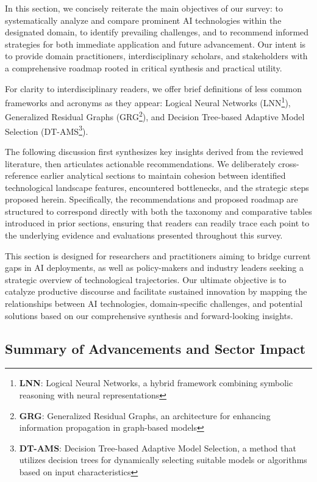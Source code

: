 \documentclass[sigconf]{acmart}
\begin{document}
In this section, we concisely reiterate the main objectives of our survey: to systematically analyze and compare prominent AI technologies within the designated domain, to identify prevailing challenges, and to recommend informed strategies for both immediate application and future advancement. Our intent is to provide domain practitioners, interdisciplinary scholars, and stakeholders with a comprehensive roadmap rooted in critical synthesis and practical utility.

For clarity to interdisciplinary readers, we offer brief definitions of less common frameworks and acronyms as they appear: Logical Neural Networks (LNN\footnote{\textbf{LNN}: Logical Neural Networks, a hybrid framework combining symbolic reasoning with neural representations}), Generalized Residual Graphs (GRG\footnote{\textbf{GRG}: Generalized Residual Graphs, an architecture for enhancing information propagation in graph-based models}), and Decision Tree-based Adaptive Model Selection (DT-AMS\footnote{\textbf{DT-AMS}: Decision Tree-based Adaptive Model Selection, a method that utilizes decision trees for dynamically selecting suitable models or algorithms based on input characteristics}).

The following discussion first synthesizes key insights derived from the reviewed literature, then articulates actionable recommendations. We deliberately cross-reference earlier analytical sections to maintain cohesion between identified technological landscape features, encountered bottlenecks, and the strategic steps proposed herein. Specifically, the recommendations and proposed roadmap are structured to correspond directly with both the taxonomy and comparative tables introduced in prior sections, ensuring that readers can readily trace each point to the underlying evidence and evaluations presented throughout this survey.

This section is designed for researchers and practitioners aiming to bridge current gaps in AI deployments, as well as policy-makers and industry leaders seeking a strategic overview of technological trajectories. Our ultimate objective is to catalyze productive discourse and facilitate sustained innovation by mapping the relationships between AI technologies, domain-specific challenges, and potential solutions based on our comprehensive synthesis and forward-looking insights.

\subsection{Summary of Advancements and Sector Impact}
\end{document}
